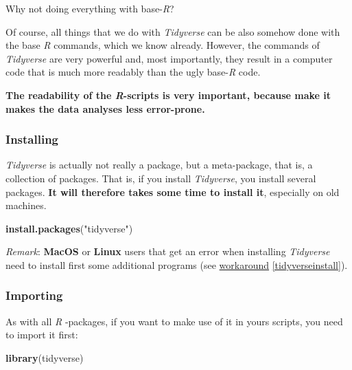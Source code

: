 \documentclass[
]{scrartcl}
\makeatletter
\newenvironment{Shaded}{\begin{snugshade}}{\end{snugshade}}
\newcommand{\FunctionTok}[1]{\textcolor[rgb]{0.13,0.29,0.53}{\textbf{#1}}}
\newcommand{\NormalTok}[1]{#1}
\newcommand{\StringTok}[1]{\textcolor[rgb]{0.31,0.60,0.02}{#1}}
\newenvironment{kframe}{%
\medskip{}
\setlength{\fboxsep}{.8em}
 \def\at@end@of@kframe{}%
 \ifinner\ifhmode%
  \def\at@end@of@kframe{\end{minipage}}%
  \begin{minipage}{\columnwidth}%
 \fi\fi%
 \def\FrameCommand##1{\hskip\@totalleftmargin \hskip-\fboxsep
 \colorbox{shadecolor}{##1}\hskip-\fboxsep
     \hskip-\linewidth \hskip-\@totalleftmargin \hskip\columnwidth}%
 \MakeFramed {\advance\hsize-\width
   \@totalleftmargin\z@ \linewidth\hsize
   \@setminipage}}%
 {\par\unskip\endMakeFramed%
 \at@end@of@kframe}
\newenvironment{rmdblock}[1]
  {
  \begin{itemize}
  \renewcommand{\labelitemi}{
    \raisebox{-.7\height}[0pt][0pt]{
      {\setkeys{Gin}{width=3em,keepaspectratio}\texttt{[image: images/\#1]}}
    }
  }
  \setlength{\fboxsep}{1em}
  \begin{kframe}
  \item
  }
  {
  \end{kframe}
  \end{itemize}
  }
\newenvironment{important}
    {\begin{rmdblock}{hint}}
    {\end{rmdblock}}
\makeatother
\begin{document}
\begin{important}
Why not doing everything with base-\emph{R}?

Of course, all things that we do with \emph{Tidyverse} can be also
somehow done with the base \emph{R} commands, which we know already.
However, the commands of \emph{Tidyverse} are very powerful and, most
importantly, they result in a computer code that is much more readably
than the ugly base-\emph{R} code.

\textbf{The readability of the \emph{R}-scripts is very important,
because make it makes the data analyses less error-prone.}
\end{important}

\hypertarget{installing}{%
\subsubsection*{Installing}\label{installing}}

\emph{Tidyverse} is actually not really a package, but a meta-package, that is, a collection of packages. That is, if you install \emph{Tidyverse}, you install several packages. \textbf{It will therefore takes some time to install it}, especially on old machines.

\begin{Shaded}
\begin{Highlighting}[]
\FunctionTok{install.packages}\NormalTok{(}\StringTok{"tidyverse"}\NormalTok{)}
\end{Highlighting}
\end{Shaded}

\emph{Remark}: \textbf{MacOS} or \textbf{Linux} users that get an error when installing \emph{Tidyverse} need to install first some additional programs (see \protect\hyperlink{tidyverseinstall}{workaround} \ref{tidyverseinstall}).

\hypertarget{importing}{%
\subsubsection*{Importing}\label{importing}}

As with all \emph{R} -packages, if you want to make use of it in yours scripts, you need to import it first:

\begin{Shaded}
\begin{Highlighting}[]
\FunctionTok{library}\NormalTok{(tidyverse)}
\end{Highlighting}
\end{Shaded}
\end{document}
